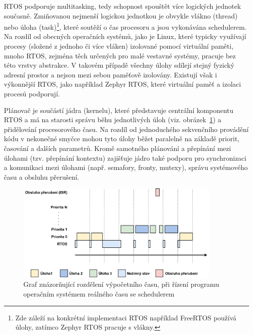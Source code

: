 RTOS podporuje multitasking, tedy schopnost spouštět více logických jednotek současně. Zmiňovanou nejmenší logickou jednotkou je obvykle vlákno (thread) nebo úloha (task)\footnote{Zde záleží na konkrétní implementaci RTOS například FreeRTOS používá úlohy, zatímco Zephyr RTOS pracuje s vlákny.}, které soutěží o čas procesoru a jsou vykonávána schedulerem. Na rozdíl od obecných operačních systémů, jako je Linux, které typicky využívají procesy (složené z jednoho či více vláken) izolované pomocí virtuální paměti, mnoho RTOS, zejména těch určených pro malé vestavné systémy, pracuje bez této vrstvy abstrakce. V takovém případě všechny úlohy sdílejí stejný fyzický adresní prostor a nejsou mezi sebou paměťově izolovány. Existují však i výkonnější RTOS, jako například Zephyr RTOS, které virtuální paměť a izolaci procesů podporují. \cite{freertos_what_is_rtos}

Plánovač je součástí jádra (kernelu), které představuje centrální komponentu RTOS a má na starosti správu běhu jednotlivých úloh (viz. obrázek~\ref{fig:rtos-scheduling}) a přidělování procesorového času. Na rozdíl od jednoduchého sekvenčního provádění kódu v nekonečné smyčce mohou tyto úlohy běžet paralelně na základě priorit, časování a dalších parametrů. Kromě samotného plánování a přepínání mezi úlohami (tzv. přepínání kontextu) zajišťuje jádro také podporu pro synchronizaci a komunikaci mezi úlohami (např. semafory, fronty, mutexy), správu systémového času a obsluhu přerušení.

\begin{figure}[h]
    \centering
    \includegraphics[width=0.90\textwidth]{obrazky-figures/rtos_scheduling.pdf}
    
    \caption{Graf znázorňující rozdělení výpočetního času, při řízení programu operačním systémem reálného času se schedulerem}
    \label{fig:rtos-scheduling}
\end{figure}

